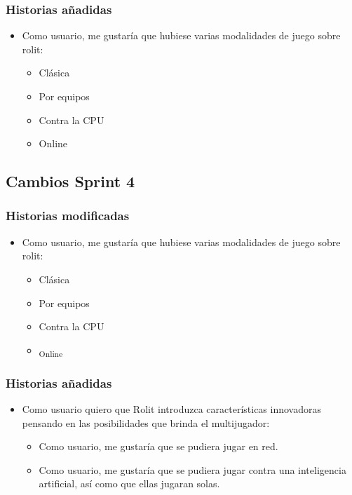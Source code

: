\documentclass[../../SCRUM.tex]{subfiles}
\begin{document}
\subsubsection*{Historias añadidas}
\begin{itemize}
\item
  Como usuario, me gustaría que hubiese varias modalidades de juego
  sobre rolit:

  \begin{itemize}
  \item
    Clásica
  \item
    Por equipos
  \item
    Contra la CPU
  \item
    Online
  \end{itemize}
\end{itemize}

\subsection{Cambios Sprint 4}

\subsubsection*{Historias modificadas}
\begin{itemize}
\item
  Como usuario, me gustaría que hubiese varias modalidades de juego
  sobre rolit:

  \begin{itemize}
  \item
    Clásica
  \item
    Por equipos
  \item
     Contra la CPU
  \item
    \textsubscript{Online}
  \end{itemize}
\end{itemize}

\subsubsection*{Historias añadidas}
\begin{itemize}
\item
  Como usuario quiero que Rolit introduzca características innovadoras
  pensando en las posibilidades que brinda el multijugador:

  \begin{itemize}
  \item
    Como usuario, me gustaría que se pudiera jugar en red.
  \item
    Como usuario, me gustaría que se pudiera jugar contra una
    inteligencia artificial, así como que ellas jugaran solas.
  \end{itemize}
\end{itemize}
\end{document}

